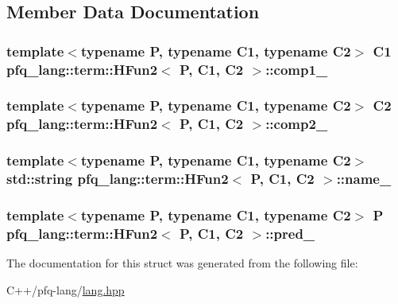 \subsection{Member Data Documentation}
\hypertarget{structpfq__lang_1_1term_1_1HFun2_a7c395ee57e98d0991b54984ed3da65a8}{
\subsubsection[{comp1\+\_\+}]{\setlength{\rightskip}{0pt plus 5cm}template$<$typename P, typename C1, typename C2$>$ C1 {\bf pfq\+\_\+lang\+::term\+::\+H\+Fun2}$<$ P, C1, C2 $>$\+::comp1\+\_\+}}\label{structpfq__lang_1_1term_1_1HFun2_a7c395ee57e98d0991b54984ed3da65a8}
\hypertarget{structpfq__lang_1_1term_1_1HFun2_a9d891e5539b5140e3ba2c4a02c9ac1fb}{
\subsubsection[{comp2\+\_\+}]{\setlength{\rightskip}{0pt plus 5cm}template$<$typename P, typename C1, typename C2$>$ C2 {\bf pfq\+\_\+lang\+::term\+::\+H\+Fun2}$<$ P, C1, C2 $>$\+::comp2\+\_\+}}\label{structpfq__lang_1_1term_1_1HFun2_a9d891e5539b5140e3ba2c4a02c9ac1fb}
\hypertarget{structpfq__lang_1_1term_1_1HFun2_aa3808dccb93ad00cfd0be7caa80f30b9}{
\subsubsection[{name\+\_\+}]{\setlength{\rightskip}{0pt plus 5cm}template$<$typename P, typename C1, typename C2$>$ std\+::string {\bf pfq\+\_\+lang\+::term\+::\+H\+Fun2}$<$ P, C1, C2 $>$\+::name\+\_\+}}\label{structpfq__lang_1_1term_1_1HFun2_aa3808dccb93ad00cfd0be7caa80f30b9}
\hypertarget{structpfq__lang_1_1term_1_1HFun2_aa33f80727f25efed1112901cbcf1098a}{
\subsubsection[{pred\+\_\+}]{\setlength{\rightskip}{0pt plus 5cm}template$<$typename P, typename C1, typename C2$>$ P {\bf pfq\+\_\+lang\+::term\+::\+H\+Fun2}$<$ P, C1, C2 $>$\+::pred\+\_\+}}\label{structpfq__lang_1_1term_1_1HFun2_aa33f80727f25efed1112901cbcf1098a}


The documentation for this struct was generated from the following file\+:\begin{DoxyCompactItemize}
\item 
C++/pfq-\/lang/\hyperlink{lang_8hpp}{lang.\+hpp}\end{DoxyCompactItemize}
